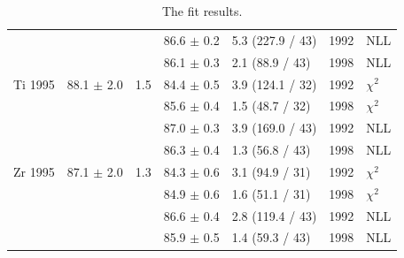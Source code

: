 \begin{table}[H]
\begin{center}
\begin{tabular}{|l||l|l|l|l|l|l|}
                &                &     & 86.6 $\pm$ 0.2 & 5.3 (227.9 / 43) & 1992 & NLL \\
                &                &     & 86.1 $\pm$ 0.3 & 2.1 (88.9 / 43) & 1998 & NLL \\
      \hline                                                               
       Ti 1995   & 88.1 $\pm$ 2.0 & 1.5 &84.4 $\pm$ 0.5 & 3.9 (124.1 / 32) & 1992 & $\chi^2$ \\  
                 &                &     &85.6 $\pm$ 0.4 & 1.5 (48.7 / 32)  & 1998 & $\chi^2$ \\  
                                                                           
                &                &     & 87.0 $\pm$ 0.3 & 3.9 (169.0 / 43) & 1992 & NLL \\
                &                &     & 86.3 $\pm$ 0.4 & 1.3 (56.8 / 43) & 1998 & NLL \\
      \hline                                                               
       Zr 1995   & 87.1 $\pm$ 2.0 & 1.3 &84.3 $\pm$ 0.6 & 3.1 (94.9 / 31)  & 1992 & $\chi^2$ \\  
                 &                &     &84.9 $\pm$ 0.6 & 1.6 (51.1 / 31)  & 1998 & $\chi^2$ \\  
                                                                           
                &                &     & 86.6 $\pm$ 0.4 & 2.8 (119.4 / 43) & 1992 & NLL \\
                &                &     & 85.9 $\pm$ 0.5 & 1.4 (59.3 / 43) & 1998 & NLL \\
      \hline
                                                                                
    \end{tabular}
  \end{center}
  \caption{The fit results.}
  \label{table:fits1995}
\end{table}

